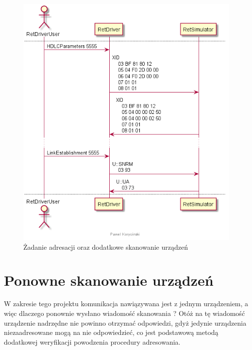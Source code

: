     \begin{figure}[h!]
    \centering
    \includegraphics[scale=0.75]{out/Diagramy/UML_DiagramOfSequence_New/RetCalibration-page3.png}
    \caption{Żadanie adresacji oraz dodatkowe skanowanie urządzeń}
    \end{figure}

    \section{Ponowne skanowanie urządzeń}
    W zakresie tego projektu komunikacja nawiązywana jest z jednym urządzeniem, a więc dlaczego
    ponownie wysłano wiadomość skanowania ? Otóż na tę wiadomość urządzenie nadrzędne
    nie powinno otrzymać odpowiedzi, gdyż jedynie urządzenia niezaadresowane mogą na nie 
    odpowiedzieć, co jest podstawową metodą dodatkowej weryfikacji powodzenia procedury
    adresowania.

